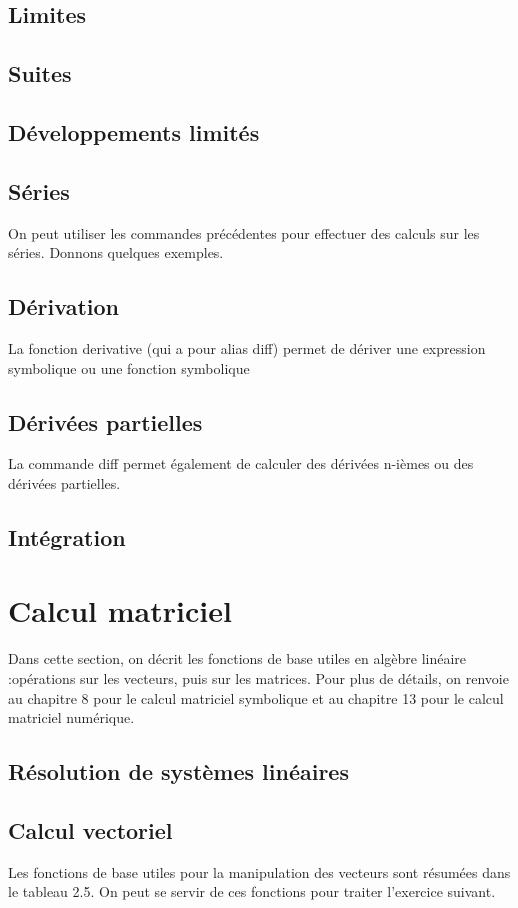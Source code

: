  \subsection{Limites}
 \subsection{Suites}
 \subsection{Développements limités}
 \subsection{Séries}
  On peut utiliser les commandes précédentes pour effectuer des calculs sur les séries. Donnons quelques exemples.
 \subsection{Dérivation}
 La fonction derivative (qui a pour alias diff) permet de dériver une expression symbolique ou une fonction symbolique
 \subsection{Dérivées partielles}
 La commande diff permet également de calculer des dérivées n-ièmes ou des dérivées partielles.
 \subsection{Intégration}
 \section{Calcul matriciel}
  Dans cette section, on décrit les fonctions de base utiles en algèbre linéaire :opérations sur les vecteurs, puis sur les matrices. Pour plus de détails, on renvoie au chapitre 8 pour le calcul matriciel symbolique et au chapitre 13 pour le calcul matriciel numérique.
  \subsection{Résolution de systèmes linéaires}
  \subsection{Calcul vectoriel}
  Les fonctions de base utiles pour la manipulation des vecteurs sont résumées dans le tableau 2.5. On peut se servir de ces fonctions pour traiter l'exercice suivant.
